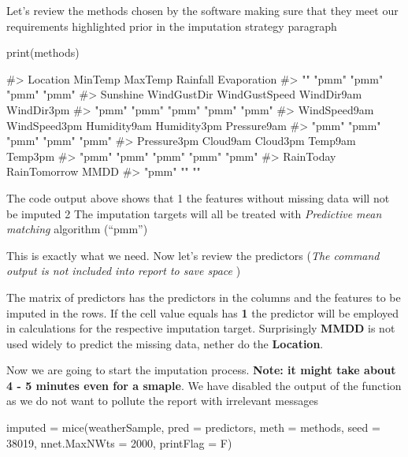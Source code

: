 Let's review the methods chosen by the software making sure that they
meet our requirements highlighted prior in the imputation strategy
paragraph

\begin{Schunk}
\begin{Sinput}
print(methods)
\end{Sinput}
\begin{Soutput}
#>      Location       MinTemp       MaxTemp      Rainfall   Evaporation 
#>            ""         "pmm"         "pmm"         "pmm"         "pmm" 
#>      Sunshine   WindGustDir WindGustSpeed    WindDir9am    WindDir3pm 
#>         "pmm"         "pmm"         "pmm"         "pmm"         "pmm" 
#>  WindSpeed9am  WindSpeed3pm   Humidity9am   Humidity3pm   Pressure9am 
#>         "pmm"         "pmm"         "pmm"         "pmm"         "pmm" 
#>   Pressure3pm      Cloud9am      Cloud3pm       Temp9am       Temp3pm 
#>         "pmm"         "pmm"         "pmm"         "pmm"         "pmm" 
#>     RainToday  RainTomorrow          MMDD 
#>         "pmm"            ""            ""
\end{Soutput}
\end{Schunk}

The code output above shows that 1 the features without missing data
will not be imputed 2 The imputation targets will all be treated with
\emph{Predictive mean matching} algorithm (``pmm'')

This is exactly what we need. Now let's review the predictors (\emph{The
command output is not included into report to save space })

The matrix of predictors has the predictors in the columns and the
features to be imputed in the rows. If the cell value equals has
\textbf{1} the predictor will be employed in calculations for the
respective imputation target. Surprisingly \textbf{MMDD} is not used
widely to predict the missing data, nether do the \textbf{Location}.

Now we are going to start the imputation process. \textbf{Note: it might
take about 4 - 5 minutes even for a smaple}. We have disabled the output
of the function as we do not want to pollute the report with irrelevant
messages

\begin{Schunk}
\begin{Sinput}
imputed = mice(weatherSample, pred = predictors, meth = methods, seed = 38019,
               nnet.MaxNWts = 2000, printFlag = F)
\end{Sinput}
\end{Schunk}

